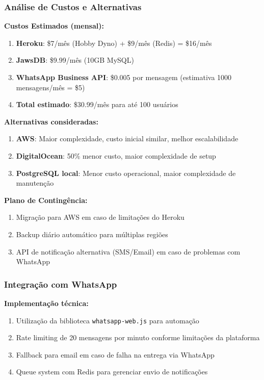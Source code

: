 \documentclass[12pt, a4paper]{article}
\begin{document}
\begin{spacing}{1.5}
\subsubsection{Análise de Custos e Alternativas}
\begin{spacing}{1.5}
\textbf{Custos Estimados (mensal):}
\begin{enumerate}[label=\alph*)]
\item \textbf{Heroku}: \$7/mês (Hobby Dyno) + \$9/mês (Redis) = \$16/mês
\item \textbf{JawsDB}: \$9.99/mês (10GB MySQL)
\item \textbf{WhatsApp Business API}: \$0.005 por mensagem (estimativa 1000 mensagens/mês = \$5)
\item \textbf{Total estimado}: \$30.99/mês para até 100 usuários
\end{enumerate}

\textbf{Alternativas consideradas:}
\begin{enumerate}[label=\alph*)]
\item \textbf{AWS}: Maior complexidade, custo inicial similar, melhor escalabilidade
\item \textbf{DigitalOcean}: 50\% menor custo, maior complexidade de setup
\item \textbf{PostgreSQL local}: Menor custo operacional, maior complexidade de manutenção
\end{enumerate}

\textbf{Plano de Contingência:}
\begin{enumerate}[label=\alph*)]
\item Migração para AWS em caso de limitações do Heroku
\item Backup diário automático para múltiplas regiões
\item API de notificação alternativa (SMS/Email) em caso de problemas com WhatsApp
\end{enumerate}
\end{spacing}

\subsubsection{Integração com WhatsApp}
\begin{spacing}{1.5}
\textbf{Implementação técnica:}
\begin{enumerate}[label=\alph*)]
\item Utilização da biblioteca \texttt{whatsapp-web.js} para automação
\item Rate limiting de 20 mensagens por minuto conforme limitações da plataforma
\item Fallback para email em caso de falha na entrega via WhatsApp
\item Queue system com Redis para gerenciar envio de notificações
\end{enumerate}


\end{spacing}
\end{spacing}
\end{document}
